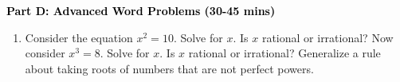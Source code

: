 \documentclass[12pt, letterpaper, fleqn]{article}
\begin{document}
\newpage

\begin{tcolorbox}[colback=customteal!20]
\large\textcolor{black}{\textbf{Part D: Advanced Word Problems (30-45 mins)}}
\end{tcolorbox}

\vspace{3mm}

\begin{enumerate}[itemsep=5.5cm, leftmargin=0.6cm, resume]
\item Consider the equation $x^2 = 10$. Solve for $x$. Is $x$ rational or irrational? Now consider $x^3 = 8$. Solve for $x$. Is $x$ rational or irrational? Generalize a rule about taking roots of numbers that are not perfect powers.
\end{enumerate}
\end{document}
